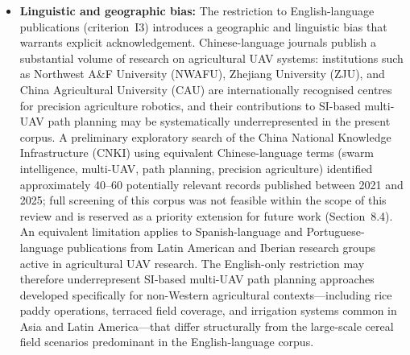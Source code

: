 \documentclass[review,3p,times]{elsarticle}
\begin{document}
\begin{itemize}
  \item \textbf{Linguistic and geographic bias:} The restriction to English-language publications (criterion~I3) introduces a geographic and linguistic bias that warrants explicit acknowledgement. Chinese-language journals publish a substantial volume of research on agricultural UAV systems: institutions such as Northwest A\&F University (NWAFU), Zhejiang University (ZJU), and China Agricultural University (CAU) are internationally recognised centres for precision agriculture robotics, and their contributions to SI-based multi-UAV path planning may be systematically underrepresented in the present corpus. A preliminary exploratory search of the China National Knowledge Infrastructure (CNKI) using equivalent Chinese-language terms (swarm intelligence, multi-UAV, path planning, precision agriculture) identified approximately 40--60 potentially relevant records published between 2021 and 2025; full screening of this corpus was not feasible within the scope of this review and is reserved as a priority extension for future work (Section~8.4). An equivalent limitation applies to Spanish-language and Portuguese-language publications from Latin American and Iberian research groups active in agricultural UAV research. The English-only restriction may therefore underrepresent SI-based multi-UAV path planning approaches developed specifically for non-Western agricultural contexts---including rice paddy operations, terraced field coverage, and irrigation systems common in Asia and Latin America---that differ structurally from the large-scale cereal field scenarios predominant in the English-language corpus.

\end{itemize}
\end{document}
